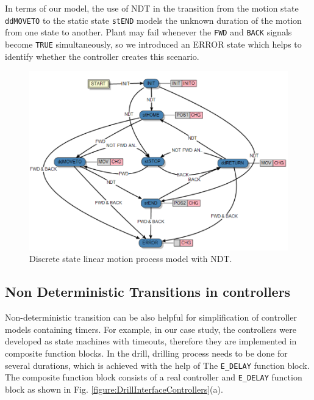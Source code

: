\begin{bibunit}
In terms of our model, the use of NDT in the transition from the motion state \texttt{ddMOVETO} to the static state \texttt{stEND} models the unknown duration of the motion from one state to another. Plant may fail whenever the \texttt{FWD} and \texttt{BACK} signals become \texttt{TRUE} simultaneously, so we introduced an ERROR state which helps to identify whether the controller creates this scenario.

\begin{figure}[h]
    \centering
    \includegraphics[scale = 0.4]{MX_Papers/Paper2/images/LinearDAFinal.PNG}
    \caption{Discrete state linear motion process model with NDT.}
    \label{figure:DrillECC}
\end{figure}

\subsection{Non Deterministic Transitions in controllers}

Non-deterministic transition can be also helpful for simplification of controller models containing timers. For example, in our case study, the controllers were developed as state machines with timeouts, therefore they are implemented in composite function blocks. In the drill, drilling process needs to be done for several durations, which is achieved with the help of The \texttt{E\_DELAY} function block. The composite function block consists of a real controller and \texttt{E\_DELAY} function block as shown in Fig. \ref{figure:DrillInterfaceControllers}(a). 


\end{bibunit}
